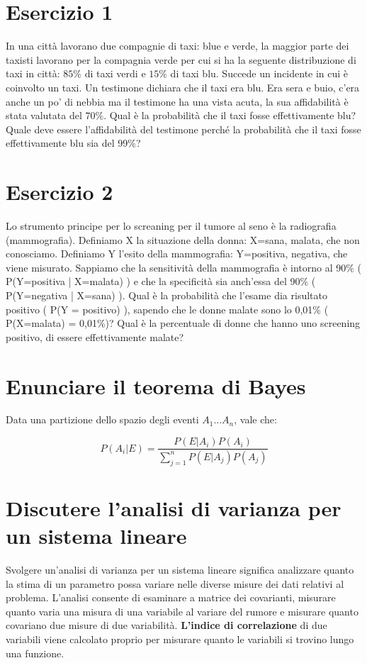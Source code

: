 \documentclass[\main/main.tex]{subfiles}
\begin{document}
\section{Esercizio 1}
In una città lavorano due compagnie di taxi: blue e verde, la maggior parte dei taxisti lavorano per la compagnia verde per cui si ha la seguente distribuzione di taxi in città: $85\%$ di taxi verdi e $15\%$ di taxi blu. Succede un incidente in cui è coinvolto un taxi. Un testimone dichiara che il taxi era blu. Era sera e buio, c'era anche un po' di nebbia ma il testimone ha una vista acuta, la sua affidabilità è stata valutata del $70\%$. Qual è la probabilità che il taxi fosse effettivamente blu? Quale deve essere l'affidabilità del testimone perché la probabilità che il taxi fosse effettivamente blu sia del 99\%? 

\section{Esercizio 2}
Lo strumento principe per lo screaning per il tumore al seno è la radiografia (mammografia). Definiamo X la situazione della donna: X={sana, malata}, che non conosciamo. Definiamo Y l'esito della mammografia: Y={positiva, negativa}, che viene misurato. Sappiamo che la sensitività della mammografia è intorno al 90\% ( P(Y=positiva | X=malata) ) e che la specificità sia anch'essa del 90\% ( P(Y=negativa | X=sana) ). Qual è la probabilità che l'esame dia risultato positivo ( P(Y = positivo) ), sapendo che le donne malate sono lo 0,01\% ( P(X=malata) = 0,01\%)? Qual è la percentuale di donne che hanno uno screening positivo, di essere effettivamente malate?

\section{Enunciare il teorema di Bayes}
Data una partizione dello spazio degli eventi $A_1...A_n$, vale che:

\[
	P(A_i|E) = \dfrac{P(E|A_i)P(A_i)}{\sum_{j=1}^n P(E|A_j)P(A_j)}
\]

\section{Discutere l'analisi di varianza per un sistema lineare}
Svolgere un'analisi di varianza per un sistema lineare significa analizzare quanto la stima di un parametro possa variare nelle diverse misure dei dati relativi al problema. 
L'analisi consente di esaminare a matrice dei covarianti, misurare quanto varia una misura di una variabile al variare del rumore e misurare quanto covariano due misure di due variabilità.
\textbf{L'indice di correlazione} di due variabili viene calcolato proprio per misurare quanto le variabili si trovino lungo una funzione.
\end{document}
